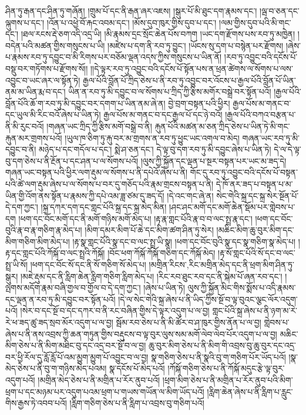 ཤིན་ཏུ་རྒན་དང་ཤིན་ཏུ་གཞོན། །གྲུམ་པོ་དང་ནི་རྒན་ཞར་འཇས། །སྒུར་པོ་མི་ཐུང་དག་རྣམས་དང་། །ལྦ་བ་ཅན་དང་ལྐུགས་པ་དང་། །འོན་པ་འཕྱེ་བོ་རྐང་འབམ་དང་། །མོས་དུབ་ཁུར་གྱིས་དུབ་པ་དང་། །ལམ་གྱིས་དུབ་པའི་མི་གང་དང་། །ཐལ་རངས་རྡེ་ཅག་འདི་འདྲ་ཡི། །མི་རྣམས་དྲང་སྲོང་ཆེན་པོས་བཀག །ཡང་དག་རྫོགས་པས་རབ་ཏུ་མཁྱེན། །བདེན་པའི་མཚན་གྱིས་གསུངས་པ་ཡི། །མཛེས་པ་དག་ནི་རབ་ཏུ་བྱུང་། །ཡོངས་སུ་དག་པ་བསྙེན་པར་རྫོགས། །ཞེས་པ་རྣམས་རབ་ཏུ་དབྱུང་བ་མི་རིགས་པར་བཅོམ་ལྡན་འདས་ཀྱིས་གསུངས་པ་ཡིན་ནོ། །རབ་ཏུ་འབྱུང་བའི་དངོས་པོ་བསྡུ་བར་གཏོགས་པ་རྫོགས་སོ།། །།དེ་ལྟར་རབ་ཏུ་འབྱུང་བའི་དངོས་པོ་སྟོན་པས་ན་ཕྲན་ཚེགས་ལ་སོགས་པ་ལས་འབྱུང་བ་ཡང་ཞར་ལ་སྟོན་ཏེ། རྒྱལ་པོའི་བློན་པོ་ཀྲིད་ཅེས་པ་ནི་རབ་ཏུ་འབྱུང་བར་འོངས་པ་རྒྱལ་པོའི་བློན་པོ་ཡིན་ནམ་མ་ཡིན་རྨ་བ་དང་། ཡིན་ན་རབ་ཏུ་མི་དབྱུང་བ་ལ་སོགས་པ་ཀྲིད་ཀྱི་རྩིས་མགོར་བསྒྲེ་བར་སྟོན་པའོ། །རྒྱལ་པོའི་བློན་པོའི་ཆོ་ག་རབ་ཏུ་མི་དབྱུང་བར་དགག་པ་ཡིན་ནམ་ཞེ་ན། བྱེ་བྲག་བསྟན་པའི་ཕྱིར། རྒྱལ་པོས་མ་གནང་བ་དང་ཡུལ་མི་རིང་བའོ་ཞེས་པ་ཡིན་ཏེ། རྒྱལ་པོས་མ་གནང་བ་དང་རྒྱལ་པོ་དང་ཉེ་བའོ། །རྒྱལ་པོའི་བཀའ་བརྩན་པ་ནི་མི་རུང་བའོ། །གཞན་ཡང་ཀྲིད་ཀྱི་རྩིས་མགོ་བསྒྲེ་བ་ནི། རྐུན་པོའི་མཚན་མ་ཅན་ཀྲིད་ཅེས་པ་ཡིན་ཏེ་མི་གང་རྐུན་མར་གྲགས་པའོ། །ཡུལ་ཁ་ཅིག་ཏུ་རྐུ་བར་མ་གྲགས་ན་རབ་ཏུ་ཕྱུང་ཡང་འགལ་བ་མེད། གཞན་ཡང་རབ་ཏུ་མི་དབྱུང་བ་ནི། མཉེད་པ་དང་གདོལ་པ་དང་། སྨེ་ཤ་ཅན་དང་། དེ་ལྟ་བུ་དག་རབ་ཏུ་མི་དབྱུང་ཞེས་པ་ཡིན་ཏེ། དེ་ལ་དེ་ལྟ་བུ་དག་ཅེས་པ་ནི་རྔོན་པ་དང་ཤན་པ་ལ་སོགས་པའོ། །ལུས་ཀྱི་སྐྱོན་དང་ལྡན་པ་སྔར་བསྟན་པར་ཡང་མ་ཟད་དེ། གཞན་ཡང་བསྟན་པའི་ཕྱིར་ལག་རྡུམ་ལ་སོགས་པ་ནི་དཔེའོ་ཞེས་པ་ནི། གོང་དུ་རབ་ཏུ་འབྱུང་བའི་དངོས་པོ་བསྟན་པའི་ཚེ་ལག་རྡུམ་ཞེས་པ་ལ་སོགས་པ་བར་དུ་གཅོད་པའི་རྣམ་གྲངས་བསྟན་པ་ནི། དེ་ཁོ་ནར་ཟད་པ་བསྟན་པ་མ་ཡིན་གྱི་འོག་ནས་སྟོན་པ་རྣམས་ཀྱི་དཔེ་འམ་ཟླ་ཙམ་དུ་ཟད་དོ། །དེ་འང་གང་ཞེ་ན། སེང་གེའི་སྐྲ་དང་སྐྲ་སེར་སྔོན་པོ་དེ་དག་ཀྱང་། །སྐྲ་དཀར་དག་དང་གླང་པོའི་སྐྲ་དང་སྐྲ་མེད་མིན། །ཤང་ཤང་མགོ་དང་མགོ་ཆེན་སྡོམ་པར་གླེབས་པ་དག །ཕག་དང་བོང་མགོ་དང་ནི་མགོ་གཉིས་མགོ་མེད་པ། །རྟ་རྣ་གླང་པོའི་རྣ་བ་བ་ལང་སྤྲ་རྣ་དང་། །ཕག་དང་བོང་བུའི་རྣ་བ་རྣ་གཅིག་རྣ་མེད་པ། །མིག་དམར་མིག་པོ་ཆེ་དང་མིག་ཚག་ཤིན་ཏུ་སེར། །མཆིང་མིག་ཆུ་བུར་མིག་དང་མིག་གཅིག་མིག་མེད་པ། །རྟ་སྣ་གླང་པོའི་སྣ་དང་བ་ལང་སྤྲ་ཡི་སྣ། །ཕག་དང་བོང་བུའི་སྣ་དང་སྣ་གཅིག་སྣ་མེད་པ། །རྟ་དང་གླང་པོའི་ཀོསྐོ་བ་ལང་སྤྲའི་ཀོསྐོ། །བོང་ཕག་ཀོསྐོ་ཀོསྐོ་གཅིག་དང་ཀོསྐོ་མེད། །རྟ་སོ་གླང་པོའི་སོ་དང་བ་ལང་སྤྲ་ཡི་སོ། །ཕག་དང་བོང་སོ་དང་ནི་སོ་གཅིག་སོ་མེད་པ། །མགྲིན་{རིངས་,རིང་}མགྲིན་མེད་དང་ནི་ཕྲག་མིག་ཤིན་ཏུ་སྒུར། །མཇེ་རྡུམ་དང་ནི་རླིག་ཆེན་རླིག་གཅིག་རླིག་མེད་པ། །རིང་རབ་ཐུང་རབ་དང་ནི་སྐེམ་པོ་ཞན་རབ་དང་། །ལྤགས་མདོག་རྣམ་བཞི་གྱལ་བ་གྱོལ་བ་དེ་དག་ཀྱང་། །ཞེས་པ་ཡིན་ཏེ། ལུས་ཀྱི་སྐྱོན་མིང་གིས་སྨོས་པ་འདི་རྣམས་དང་ལྡན་ན་རབ་ཏུ་མི་དབྱུང་བར་སྟོན་པའོ། །དེ་ལ་སེང་གེའི་སྐྲ་ཞེས་པ་ནི་ཡིད་ཀྱིས་སྔོ་བ་ལྟ་བུའང་ལྕང་ལོར་འདུག་པའོ། །སེར་བ་དང་སྔོ་བ་དང་དཀར་བ་ནི་རང་བཞིན་གྱིས་དེ་ལྟར་འདུག་པ་ལ་བྱ། གླང་པོའི་སྐྲ་ཞེས་པ་ནི་ཉག་མ་རེ་རེ་ཕ་ཟད་ཚུ་ཟད་སྲབ་མོར་འདུག་པ་ལ་བྱ། སྦོམ་རབ་ཅེས་པ་ནི་མི་ཚོར་བ་ཤ་ཁུར་གྱིས་ནོན་པ་ལ་བྱ། གླེབས་པ་ཞེས་པ་ནི་ནས་འབྲས་ཀྱི་ཆན་གཏུན་གྱིས་བརྡུངས་བ་ལྟ་བུར་ལུས་སམ་མགོ་ལེབ་ལེབ་པོར་འདུག་པ་ལ་བྱ། མཆིང་མིག་ཅེས་པ་ནི་མིག་མཐིང་བུ་དང་འདྲ་བར་སྔོ་བ་ལ་བྱ། ཆུ་བུར་མིག་ཅེས་པ་ནི་མིག་གི་འབྲས་བུ་ཆུ་བུར་དང་འདྲ་བར་ཕྱི་རོལ་དུ་རློ་རློ་པོ་འམ་མྱུག་མྱུག་པོ་འབྱུང་བ་ལ་བྱ། སྣ་གཅིག་ཅེས་པ་ནི་སྣའི་བུ་ག་གཅིག་པོར་ཡོད་པའོ། །སྣ་མེད་ཅེས་པ་ནི་བུ་ག་གཉིས་མེད་པའམ། སྣ་དངོས་པོ་མེད་པའོ། །ཀོསྐོ་གཅིག་ཅེས་པ་ནི་ཀོསྐོ་མདུང་རྩེ་ལྟ་བུར་འདུག་པའོ། །མགྲིན་མེད་ཅེས་པ་ནི་མགྲིན་པ་རོར་ནུབ་པའོ། །ཕྲག་མིག་ཅེས་པ་ནི་མགྲིན་པ་རོར་ནུབ་པའི་མིག་ཕྲག་པ་དང་མཉམ་པར་འདུག་པའམ་ཕྲག་པ་གཡས་གཡོན་ལ་མིག་ཡོད་པའོ། །རླིག་ཆེན་ཞེས་པ་ནི་རླིག་པ་རླུང་གིས་རྒྱས་ཏེ་འབབ་པའོ། །རླིག་གཅིག་ཅེས་པ་ནི་རླིག་པ་འབྲས་བུ་གཅིག་པའོ། 